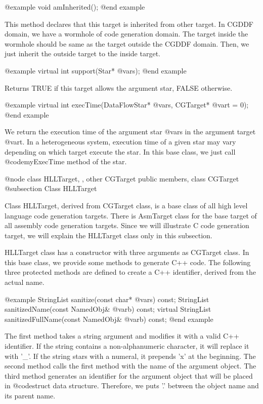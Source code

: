 @example
void amInherited();
@end example

This method declares that this target is inherited from other target.
In CGDDF domain, we have a wormhole of code generation domain. The
target inside the wormhole should be same as the target outside the
CGDDF domain. Then, we just inherit the outside target to the inside target.

@example
virtual int support(Star* @var{s});
@end example

Returns TRUE if this target allows the argument star, FALSE otherwise.

@example
virtual int execTime(DataFlowStar* @var{s}, CGTarget* @var{t} = 0);
@end example

We return the execution time of the argument star @var{s} in the argument
target @var{t}. In a heterogeneous system, execution time of a given
star may vary depending on which target execute the star. In this base
class, we just call @code{myExecTime} method of the star.

@node class HLLTarget, , other CGTarget public members, class CGTarget
@subsection Class HLLTarget

Class HLLTarget, derived from CGTarget class, is a base class of
all high level language code generation targets. There is
AsmTarget class for the base target of all assembly code generation
targets. Since we will illustrate C code generation target, we will
explain the HLLTarget class only in this subsection.

HLLTarget class has a constructor with three arguments as CGTarget class.
In this base class, we provide some methods to generate C++ code.
The following three protected methods are defined to create a
C++ identifier, derived from the actual name.

@example
StringList sanitize(const char* @var{s}) const;
StringList sanitizedName(const NamedObj& @var{b}) const;
virtual StringList sanitizedFullName(const NamedObj& @var{b}) const;
@end example

The first method takes a string argument and modifies it with a valid
C++ identifier. If the string contains a non-alphanumeric character, it
will replace it with '_'. If the string stars with a numeral, it
prepends 'x' at the beginning. The second method calls the first method
with the name of the argument object. The third method generates
an identifier for the argument object that will be placed in @code{struct}
data structure. Therefore, we puts '.' between the object name and its
parent name.

